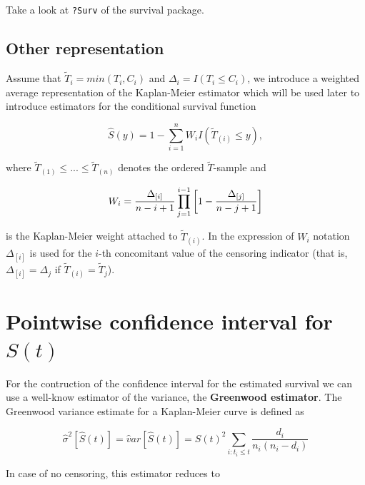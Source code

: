\documentclass[]{book}
\theoremstyle{definition}
\theoremstyle{definition}
\theoremstyle{definition}
\theoremstyle{remark}
\let\BeginKnitrBlock\begin \let\EndKnitrBlock\end
\begin{document}
\BeginKnitrBlock{rmdexercise_sestelo}
Take a look at \texttt{?Surv} of the survival package.
\EndKnitrBlock{rmdexercise_sestelo}

\subsection{Other representation}\label{other-representation}

Assume that \(\widetilde T_i = min (T_i, C_i)\) and
\(\Delta_i = I (T_i \le C_i)\), we introduce a weighted average
representation of the Kaplan-Meier estimator which will be used later to
introduce estimators for the conditional survival function

\begin{equation*}
\widehat S(y)=1-\sum_{i=1}^{n}W_{i}I(\widetilde T_{(i)}\leq y),
\end{equation*}

where
\(\widetilde T_{\left( 1\right) }\leq ...\leq \widetilde T_{\left( n\right) }\)
denotes the ordered \(\widetilde T\)-sample and

\begin{equation*}
W_{i}=\frac{\Delta_{\left[ i\right] }}{n-i+1}\prod_{j=1}^{i-1}\left[ 1-\frac{%
\Delta _{\left[ j\right] }}{n-j+1}\right]
\end{equation*}

\noindent is the Kaplan-Meier weight attached to
\(\widetilde T_{\left( i\right) }\). In the expression of \(W_{i}\)
notation \(\Delta_{\left[ i\right] }\) is used for the \(i\)-th
concomitant value of the censoring indicator (that is,
\(\Delta_{\left[ i \right] }=\Delta _{j}\) if
\(\widetilde T_{\left( i\right) }=\widetilde T_{j}\)).

\section{\texorpdfstring{Pointwise confidence interval for
\(S(t)\)}{Pointwise confidence interval for S(t)}}\label{pointwise-confidence-interval-for-st}

For the contruction of the confidence interval for the estimated
survival we can use a well-know estimator of the variance, the
\textbf{Greenwood estimator}\citep{greenwood}. The Greenwood variance
estimate for a Kaplan-Meier curve is defined as

\[
\hat \sigma^2[\hat S(t)] = \widehat var[\hat S(t)] = \hat S(t)^2 \sum_{i:t_i \le t} \frac{d_i}{n_i(n_i-d_i)}
\]

In case of no censoring, this estimator reduces to
\end{document}
